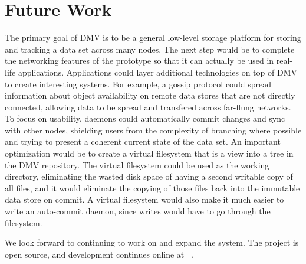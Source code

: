 \section{Future Work}

The primary goal of \gls{DMV} is to be a general low-level storage platform for
storing and tracking a data set across many nodes. The next step would be to
complete the networking features of the prototype so that it can actually be
used in real-life applications. Applications could layer additional technologies
on top of \gls{DMV} to create interesting systems. For example, a gossip
protocol could spread information about object availability on remote data
stores that are not directly connected, allowing data to be spread and
transfered across far-flung networks. To focus on usability, daemons could
automatically \gls{commit} changes and sync with other nodes, shielding users
from the complexity of branching where possible and trying to present a coherent
current state of the data set. An important optimization would be to create a
virtual filesystem that is a view into a \gls{tree} in the \gls{DMV} repository.
The virtual filesystem could be used as the working directory, eliminating the
wasted disk space of having a second writable copy of all files, and it would
eliminate the copying of those files back into the immutable data store on
\gls{commit}. A virtual filesystem would also make it much easier to write an
auto-\gls{commit} daemon, since writes would have to go through the filesystem.

We look forward to continuing to work on and expand the system. The project is
open source, and development continues online at \dmvurl~.

